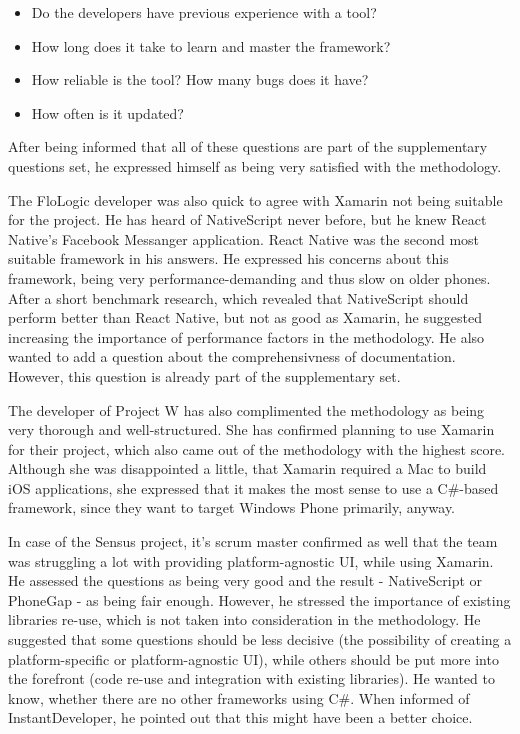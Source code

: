 \documentclass[english,master,public,dept460,male,cpdeclaration,oneside]{diploma}
\begin{document}
\begin{itemize}
	\item Do the developers have previous experience with a tool?
	\item How long does it take to learn and master the framework?
	\item How reliable is the tool? How many bugs does it have?
	\item How often is it updated?
\end{itemize}

After being informed that all of these questions are part of the supplementary questions set, he expressed himself as being very satisfied with the methodology.

The FloLogic developer was also quick to agree with Xamarin not being suitable for the project. He has heard of NativeScript never before, but he knew React Native's Facebook Messanger application. React Native was the second most suitable framework in his answers. He expressed his concerns about this framework, being very performance-demanding and thus slow on older phones. After a short benchmark research, which revealed that NativeScript should perform better than React Native, but not as good as Xamarin, he suggested increasing the importance of performance factors in the methodology. He also wanted to add a question about the comprehensivness of documentation. However, this question is already part of the supplementary set.

The developer of Project W has also complimented the methodology as being very thorough and well-structured. She has confirmed planning to use Xamarin for their project, which also came out of the methodology with the highest score. Although she was disappointed a little, that Xamarin required a Mac to build iOS applications, she expressed that it makes the most sense to use a C\#-based framework, since they want to target Windows Phone primarily, anyway.

In case of the Sensus project, it's scrum master confirmed as well that the team was struggling a lot with providing platform-agnostic UI, while using Xamarin. He assessed the questions as being very good and the result - NativeScript or PhoneGap - as being fair enough. However, he stressed the importance of existing libraries re-use, which is not taken into consideration in the methodology. He suggested that some questions should be less decisive (the possibility of creating a platform-specific or platform-agnostic UI), while others should be put more into the forefront (code re-use and integration with existing libraries). He wanted to know, whether there are no other frameworks using C\#. When informed of InstantDeveloper, he pointed out that this might have been a better choice.
\end{document}
